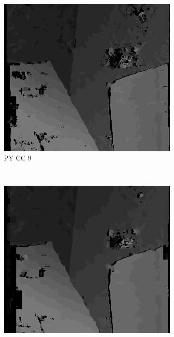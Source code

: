 \begin{figure}
  \begin{subfigure}[b]{0.23\textwidth}
    \centering
    \includegraphics[width=\textwidth]{images/stereo-pairs/venus_pyramid_crosschecked_9.png}
    \caption{PY CC 9}
  \end{subfigure}
  ~
  \begin{subfigure}[b]{0.23\textwidth}
    \centering
    \includegraphics[width=\textwidth]{images/stereo-pairs/venus_pyramid_crosschecked_13.png}

\end{subfigure}
\end{figure}
